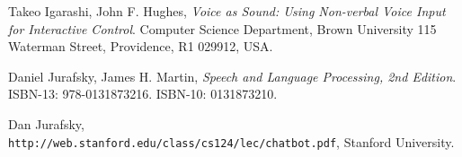 \documentclass[
	article,			%
	11pt,				%
	oneside,			%
	a4paper,			%
	english,			%
	english,				%
	]{abntex2}
\begin{document}
\medskip




\begin{thebibliography}{9}

Takeo Igarashi, John F. Hughes, 
\textit{Voice as Sound: Using Non-verbal Voice Input for Interactive Control}. 
Computer Science Department, Brown University 115 Waterman Street, Providence, R1 029912, USA.
 
Daniel Jurafsky, James H. Martin, 
\textit{Speech and Language Processing, 2nd Edition}.
ISBN-13: 978-0131873216.
ISBN-10: 0131873210.
 
Dan	Jurafsky, 
\\\texttt{http://web.stanford.edu/class/cs124/lec/chatbot.pdf},
Stanford University.

\end{thebibliography}
 
\end{document}
